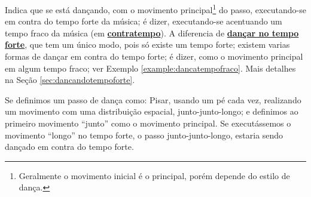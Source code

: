 \begin{definition} 
\label{def:DancaNoContratempo}
Indica que se está dançando, com o movimento principal\footnote{Geralmente o movimento inicial é o principal,
porém depende do estilo de dança.} do passo, 
executando-se em contra do tempo forte da música; é dizer, 
executando-se acentuando um tempo fraco da música (em \hyperref[sec:contratempo]{\textbf{contratempo}}).
A diferencia de \hyperref[def:DancaNoTempo]{\textbf{dançar no tempo forte}}, 
que tem um único modo, pois só existe um tempo forte;
existem varias formas de dançar em contra do tempo forte;
é dizer, como o movimento principal em algum tempo fraco; ver Exemplo \ref{example:dancatempofraco}.
Mais detalhes na Seção \ref{sec:dancandotempoforte}.
\end{definition}
\begin{example}
\label{example:dancatempofraco}
Se definimos um passo de dança como: Pisar, usando um pé cada vez, 
realizando um movimento com uma distribuição espacial, junto-junto-longo;
e definimos ao primeiro movimento ``junto'' como o movimento principal. 
Se executássemos o movimento ``longo'' no tempo forte, o passo junto-junto-longo,
estaria sendo dançado em contra do tempo forte.
\end{example}
